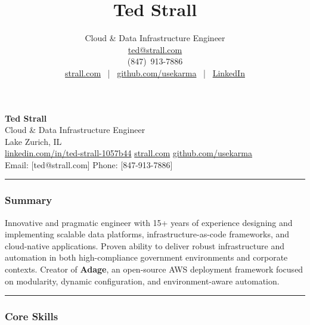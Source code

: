 \documentclass[11pt]{article}
\begin{document}
\title{Ted Strall}
\author{Cloud \& Data Infrastructure Engineer \\
\href{mailto:ted@strall.com}{ted@strall.com} \\
(847)~913-7886 \\
\href{https://strall.com}{strall.com} ~|~
\href{https://github.com/usekarma}{github.com/usekarma} ~|~
\href{https://linkedin.com/in/ted-strall-1057b44}{LinkedIn}}
\date{}

\maketitle

\textbf{Ted Strall}\\
Cloud \& Data Infrastructure Engineer\\
Lake Zurich, IL\\
\href{https://www.linkedin.com/in/ted-strall-1057b44}{linkedin.com/in/ted-strall-1057b44}
\textbar{} \href{https://strall.com}{strall.com} \textbar{}
\href{https://github.com/usekarma}{github.com/usekarma}\\
Email: {[}ted@strall.com{]} \textbar{} Phone: {[}847-913-7886{]}

\begin{center}\rule{0.5\linewidth}{0.5pt}\end{center}

\hypertarget{summary}{%
\subsubsection{Summary}\label{summary}}

Innovative and pragmatic engineer with 15+ years of experience designing
and implementing scalable data platforms, infrastructure-as-code
frameworks, and cloud-native applications. Proven ability to deliver
robust infrastructure and automation in both high-compliance government
environments and corporate contexts. Creator of \textbf{Adage}, an
open-source AWS deployment framework focused on modularity, dynamic
configuration, and environment-aware automation.

\begin{center}\rule{0.5\linewidth}{0.5pt}\end{center}

\hypertarget{core-skills}{%
\subsubsection{Core Skills}\label{core-skills}}
\end{document}
